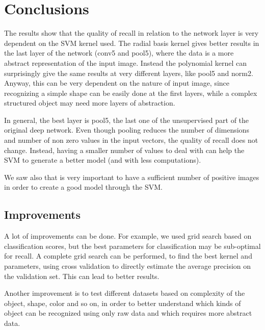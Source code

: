\section{Conclusions}

The results show that the quality of recall in relation to the network layer is
very dependent on the SVM kernel used. The radial basis kernel gives better
results in the last layer of the network (conv5 and pool5), where the data is a
more abstract representation of the input image. Instead the polynomial kernel
can surprisingly give the same results at very different layers, like pool5 and
norm2. Anyway, this can be very dependent on the nature of input image, since
recognizing a simple shape can be easily done at the first layers, while a complex
structured object may need more layers of abstraction.

In general, the best layer is pool5, the last one of the unsupervised part of the
original deep network. Even though pooling reduces the number of dimensions and
number of non zero values in the input vectors, the quality of recall does not
change. Instead, having a smaller number of values to deal with can help the
SVM to generate a better model (and with less computations).

We saw also that is very important to have a sufficient number of positive
images in order to create a good model through the SVM.

\subsection{Improvements}

A lot of improvements can be done. For example, we used grid search based on
classification scores, but the best parameters for classification may be
sub-optimal for recall. A complete grid search can be performed, to find the
best kernel and parameters, using cross validation to directly estimate the
average precision on the validation set. This can lead to better results.

Another improvement is to test different datasets based on complexity of the
object, shape, color and so on, in order to better understand which kinds of
object can be recognized using only raw data and which requires more abstract data. 


